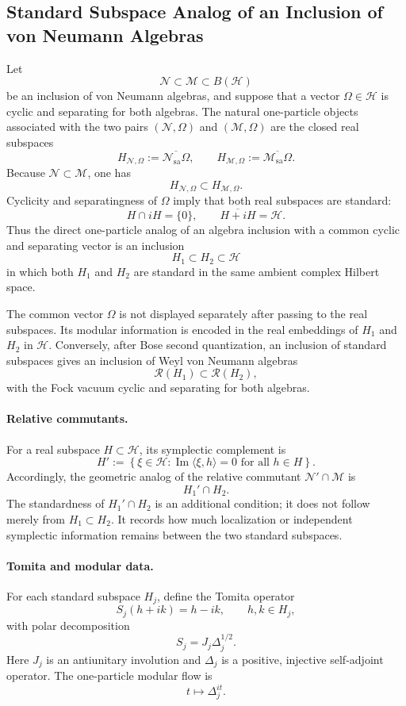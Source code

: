 \documentclass[a4paper,11pt]{article}
\theoremstyle{definition}
\newcommand{\cH}{\mathcal{H}}
\begin{document}
\subsection*{Standard Subspace Analog of an Inclusion of von Neumann Algebras}

Let
\[
\mathcal{N}\subset \mathcal{M}\subset B(\cH)
\]
be an inclusion of von Neumann algebras, and suppose that a vector
$\Omega\in\cH$ is cyclic and separating for both algebras.  The natural
one-particle objects associated with the two pairs $(\mathcal{N},\Omega)$ and
$(\mathcal{M},\Omega)$ are the closed real subspaces
\[
H_{\mathcal{N},\Omega}
   :=\overline{\mathcal{N}_{\mathrm{sa}}\Omega},
\qquad
H_{\mathcal{M},\Omega}
   :=\overline{\mathcal{M}_{\mathrm{sa}}\Omega}.
\]
Because $\mathcal{N}\subset\mathcal{M}$, one has
\[
H_{\mathcal{N},\Omega}\subset H_{\mathcal{M},\Omega}.
\]
Cyclicity and separatingness of $\Omega$ imply that both real subspaces
are standard:
\[
H\cap iH=\{0\},
\qquad
\overline{H+iH}=\cH.
\]
Thus the direct one-particle analog of an algebra inclusion with a common
cyclic and separating vector is an inclusion
\[
\boxed{H_1\subset H_2\subset\cH}
\]
in which both $H_1$ and $H_2$ are standard in the same ambient complex
Hilbert space.

The common vector $\Omega$ is not displayed separately after passing to
the real subspaces.  Its modular information is encoded in the real
embeddings of $H_1$ and $H_2$ in $\cH$.  Conversely, after Bose second
quantization, an inclusion of standard subspaces gives an inclusion of
Weyl von Neumann algebras
\[
\mathcal{R}(H_1)\subset\mathcal{R}(H_2),
\]
with the Fock vacuum cyclic and separating for both algebras.

\paragraph{Relative commutants.}
For a real subspace $H\subset\cH$, its symplectic complement is
\[
H'
   :=\left\{\xi\in\cH:
      \operatorname{Im}\langle \xi,h\rangle=0
      \text{ for all }h\in H
      \right\}.
\]
Accordingly, the geometric analog of the relative commutant
$\mathcal{N}'\cap\mathcal{M}$ is
\[
\boxed{H_1'\cap H_2.}
\]
The standardness of $H_1'\cap H_2$ is an additional condition; it does
not follow merely from $H_1\subset H_2$.  It records how much localization
or independent symplectic information remains between the two standard
subspaces.

\paragraph{Tomita and modular data.}
For each standard subspace $H_j$, define the Tomita operator
\[
S_j(h+ik)=h-ik,
\qquad h,k\in H_j,
\]
with polar decomposition
\[
S_j=J_j\Delta_j^{1/2}.
\]
Here $J_j$ is an antiunitary involution and $\Delta_j$ is a positive,
injective self-adjoint operator.  The one-particle modular flow is
\[
t\longmapsto \Delta_j^{it}.
\]
\end{document}
